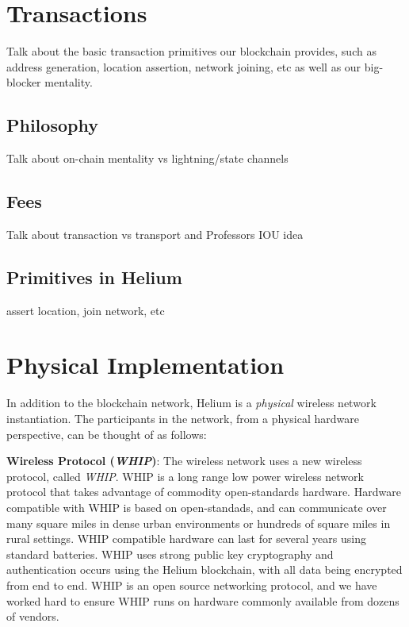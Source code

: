 \documentclass[letterpaper,11pt]{article}
\begin{document}
\section{Transactions} \label{transactions}

Talk about the basic transaction primitives our blockchain provides, such as address generation, location assertion, network joining, etc as well as our big-blocker mentality.

\subsection{Philosophy}

Talk about on-chain mentality vs lightning/state channels

\subsection{Fees}

Talk about transaction vs transport and Professors IOU idea

\subsection{Primitives in Helium}

assert location, join network, etc

\newpage

\section{Physical Implementation}

In addition to the blockchain network, Helium is a \textit{physical} wireless network instantiation. The participants in the network, from a physical hardware perspective, can be thought of as follows:\newline

\textbf{Wireless Protocol (\textit{WHIP})}: The wireless network uses a new wireless protocol, called \textit{WHIP}. WHIP is a long range low power wireless network protocol that takes advantage of commodity open-standards hardware. Hardware compatible with WHIP is based on open-standads, and can communicate over many square miles in dense urban environments or hundreds of square miles in rural settings. WHIP compatible hardware can last for several years using standard batteries. WHIP uses strong public key cryptography and authentication occurs using the Helium blockchain, with all data being encrypted from end to end. WHIP is an open source networking protocol, and we have worked hard to ensure WHIP runs on hardware commonly available from dozens of vendors.\newline
\end{document}
